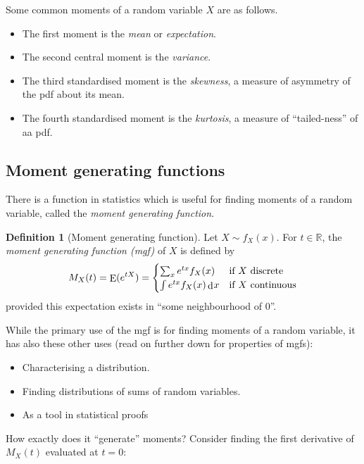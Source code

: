 \documentclass[
]{book}
\providecommand{\tightlist}{%
  \setlength{\itemsep}{0pt}\setlength{\parskip}{0pt}}
\DeclareMathOperator{\E}{E}
\newcommand{\bbR}{\mathbb{R}}
\DeclareMathOperator{\dd}{d}
\newcommand{\dint}{\dd\hspace{0.5pt}\!}
\theoremstyle{definition}
\newtheorem{definition}{Definition}[chapter]
\theoremstyle{definition}
\theoremstyle{definition}
\theoremstyle{definition}
\theoremstyle{remark}
\begin{document}
Some common moments of a random variable \(X\) are as follows.

\begin{itemize}
\tightlist
\item
  The first moment is the \emph{mean} or \emph{expectation}.
\item
  The second central moment is the \emph{variance}.
\item
  The third standardised moment is the \emph{skewness}, a measure of asymmetry of the pdf about its mean.
\item
  The fourth standardised moment is the \emph{kurtosis}, a measure of ``tailed-ness'' of aa pdf.
\end{itemize}

\hypertarget{moment-generating-functions-1}{%
\subsection{Moment generating functions}\label{moment-generating-functions-1}}

There is a function in statistics which is useful for finding moments of a random variable, called the \emph{moment generating function}.

\begin{definition}[Moment generating function]
Let \(X\sim f_X(x)\). For \(t\in\bbR\), the \emph{moment generating function (mgf)} of \(X\) is defined by
\[
M_X(t) = \E(e^{tX}) = \begin{cases}
\sum_x e^{tx} f_X(x) &\text{if $X$ discrete} \\
\int e^{tx} f_X(x) \dint x &\text{if $X$ continuous} \\
\end{cases}
\]
provided this expectation exists in ``some neighbourhood of 0''.
\end{definition}

While the primary use of the mgf is for finding moments of a random variable, it has also these other uses (read on further down for properties of mgfs):

\begin{itemize}
\tightlist
\item
  Characterising a distribution.
\item
  Finding distributions of sums of random variables.
\item
  As a tool in statistical proofs
\end{itemize}

How exactly does it ``generate'' moments? Consider finding the first derivative of \(M_X(t)\) evaluated at \(t=0\):
\end{document}
